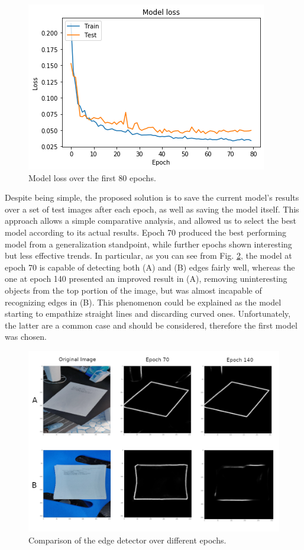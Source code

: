 \documentclass[a4paper]{article}
\begin{document}
\begin{figure}[htb!]
	\centering
	\includegraphics[width=0.7\linewidth]{model_loss.png}
	\caption{Model loss over the first 80 epochs.}
	\label{fig:model_loss}
\end{figure}

Despite being simple, the proposed solution is to save the current model's results over a set of test images after each epoch, as well as saving the model itself. This approach allows a simple comparative analysis, and allowed us to select the best model according to its actual results. Epoch 70 produced the best performing model from a generalization standpoint, while further epochs shown interesting but less effective trends. In particular, as you can see from Fig. \ref{fig:edge_comparison_epoch}, the model at epoch 70 is capable of detecting both (A) and (B) edges fairly well, whereas the one at epoch 140 presented an improved result in (A), removing uninteresting objects from the top portion of the image, but was almost incapable of recognizing edges in (B). This phenomenon could be explained as the model starting to empathize straight lines and discarding curved ones. Unfortunately, the latter are a common case and should be considered, therefore the first model was chosen.

\begin{figure}[!htbp]
	\centering
	\includegraphics[width=\linewidth]{edge_comparison_epoch.png}
	\caption{Comparison of the edge detector over different epochs.}
	\label{fig:edge_comparison_epoch}
\end{figure}
\end{document}

